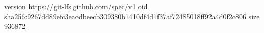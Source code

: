 version https://git-lfs.github.com/spec/v1
oid sha256:9267dd89efc3eacdbeecb309380b1410df4d1f37af72485018ff92a4d0f2c806
size 936872
